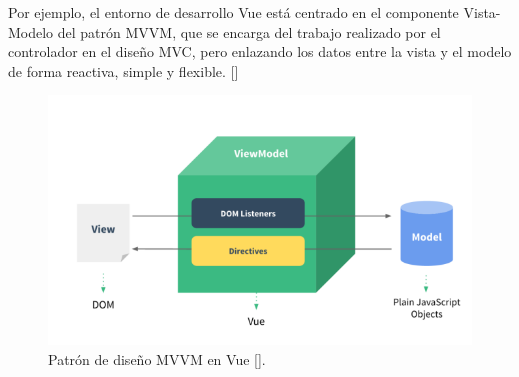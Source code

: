 Por ejemplo, el entorno de desarrollo Vue está centrado en el componente Vista-Modelo del patrón MVVM, que se encarga del trabajo realizado por el controlador en el diseño MVC, pero enlazando los datos entre la vista y el modelo de forma reactiva, simple y flexible. [\cite{49,47}]

\begin{figure}[htbp]
\centering
\includegraphics[scale=0.8]{Graphics/vmmv}
\caption{Patrón de diseño MVVM en Vue [\cite{47}].}
\label{fig:vmmv}
\end{figure}


